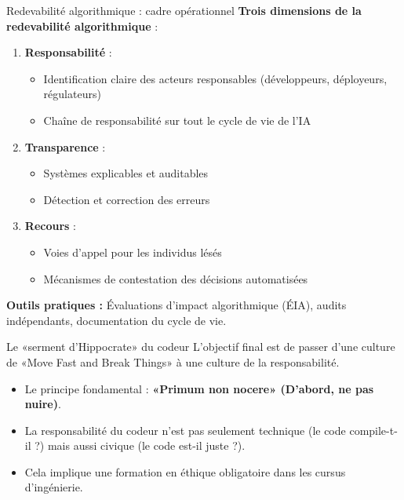 \documentclass[9pt, aspectratio=169]{beamer}
\begin{document}
\begin{frame}{Redevabilité algorithmique : cadre opérationnel}
    \textbf{Trois dimensions de la redevabilité algorithmique} :
    
    \vspace{0.3cm}
    \begin{enumerate}
        \item \textbf{Responsabilité} : 
        \begin{itemize}
            \item Identification claire des acteurs responsables (développeurs, déployeurs, régulateurs)
            \item Chaîne de responsabilité sur tout le cycle de vie de l'IA
        \end{itemize}
        
        \item \textbf{Transparence} : 
        \begin{itemize}
            \item Systèmes explicables et auditables
            \item Détection et correction des erreurs
        \end{itemize}
        
        \item \textbf{Recours} : 
        \begin{itemize}
            \item Voies d'appel pour les individus lésés
            \item Mécanismes de contestation des décisions automatisées
        \end{itemize}
    \end{enumerate}
    
    \vspace{0.3cm}
    \textbf{Outils pratiques :} Évaluations d'impact algorithmique (ÉIA), audits indépendants, documentation du cycle de vie.
\end{frame}

\begin{frame}{Le «serment d'Hippocrate» du codeur}
    L'objectif final est de passer d'une culture de «Move Fast and Break Things» à une culture de la responsabilité.
    \begin{itemize}
        \item Le principe fondamental : \textbf{«Primum non nocere» (D'abord, ne pas nuire)}.
        \item La responsabilité du codeur n'est pas seulement technique (le code compile-t-il ?) mais aussi civique (le code est-il juste ?).
        \item Cela implique une formation en éthique obligatoire dans les cursus d'ingénierie.
    \end{itemize}
\end{frame}
\end{document}
